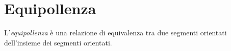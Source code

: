 \section{Equipollenza}
L'\textit{equipollenza} \`e una relazione di equivalenza tra due segmenti orientati dell'insieme dei segmenti orientati.